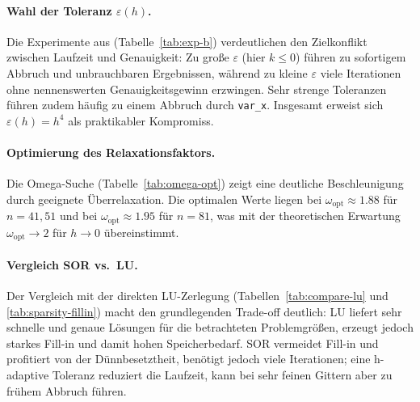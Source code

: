 \documentclass[11pt,a4paper]{article}
\begin{document}
\paragraph{Wahl der Toleranz $\varepsilon(h)$.}
Die Experimente aus (Tabelle~\ref{tab:exp-b}) verdeutlichen den Zielkonflikt zwischen Laufzeit und
Genauigkeit: Zu gro\ss e $\varepsilon$ (hier $k\le 0$) f\"uhren zu sofortigem Abbruch und unbrauchbaren Ergebnissen,
w\"ahrend zu kleine $\varepsilon$ viele Iterationen ohne nennenswerten Genauigkeitsgewinn erzwingen. Sehr strenge
Toleranzen f\"uhren zudem h\"aufig zu einem Abbruch durch \texttt{var\_x}. Insgesamt erweist sich
$\varepsilon(h)=h^4$ als praktikabler Kompromiss.

\paragraph{Optimierung des Relaxationsfaktors.}
Die Omega-Suche (Tabelle~\ref{tab:omega-opt}) zeigt eine deutliche Beschleunigung durch geeignete
\"Uberrelaxation. Die optimalen Werte liegen bei $\omega_{\mathrm{opt}}\approx 1.88$ f\"ur $n=41,51$ und bei
$\omega_{\mathrm{opt}}\approx 1.95$ f\"ur $n=81$, was mit der theoretischen Erwartung $\omega_{\mathrm{opt}}\to 2$
f\"ur $h\to 0$ \"ubereinstimmt.

\paragraph{Vergleich SOR vs.\ LU.}
Der Vergleich mit der direkten LU-Zerlegung (Tabellen~\ref{tab:compare-lu} und
\ref{tab:sparsity-fillin}) macht den grundlegenden Trade-off deutlich: LU liefert sehr schnelle und genaue
L\"osungen f\"ur die betrachteten Problemgr\"o\ss en, erzeugt jedoch starkes Fill-in und damit hohen Speicherbedarf.
SOR vermeidet Fill-in und profitiert von der D\"unnbesetztheit, ben\"otigt jedoch viele Iterationen; eine
h-adaptive Toleranz reduziert die Laufzeit, kann bei sehr feinen Gittern aber zu fr\"uhem Abbruch f\"uhren.




\printbibliography
\end{document}
